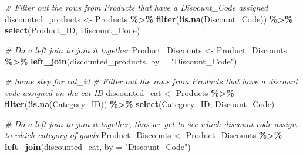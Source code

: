\documentclass[
]{article}
\newenvironment{Shaded}{\begin{snugshade}}{\end{snugshade}}
\newcommand{\AttributeTok}[1]{\textcolor[rgb]{0.13,0.29,0.53}{#1}}
\newcommand{\CommentTok}[1]{\textcolor[rgb]{0.56,0.35,0.01}{\textit{#1}}}
\newcommand{\FunctionTok}[1]{\textcolor[rgb]{0.13,0.29,0.53}{\textbf{#1}}}
\newcommand{\NormalTok}[1]{#1}
\newcommand{\OtherTok}[1]{\textcolor[rgb]{0.56,0.35,0.01}{#1}}
\newcommand{\SpecialCharTok}[1]{\textcolor[rgb]{0.81,0.36,0.00}{\textbf{#1}}}
\newcommand{\StringTok}[1]{\textcolor[rgb]{0.31,0.60,0.02}{#1}}
\begin{document}
\begin{Shaded}
\begin{Highlighting}[]
\CommentTok{\# Filter out the rows from Products that have a Disocunt\_Code assigned }
\NormalTok{discounted\_products }\OtherTok{\textless{}{-}}\NormalTok{ Products }\SpecialCharTok{\%\textgreater{}\%}
  \FunctionTok{filter}\NormalTok{(}\SpecialCharTok{!}\FunctionTok{is.na}\NormalTok{(Discount\_Code)) }\SpecialCharTok{\%\textgreater{}\%}
  \FunctionTok{select}\NormalTok{(Product\_ID, Discount\_Code)}

\CommentTok{\# Do a left join to join it together }
\NormalTok{Product\_Discounts }\OtherTok{\textless{}{-}}\NormalTok{ Product\_Discounts }\SpecialCharTok{\%\textgreater{}\%}
  \FunctionTok{left\_join}\NormalTok{(discounted\_products, }\AttributeTok{by =} \StringTok{"Discount\_Code"}\NormalTok{)}

\CommentTok{\# Same step for cat\_id}
\CommentTok{\# Filter out the rows from Products that have a discount code assigned on the cat ID}
\NormalTok{discounted\_cat }\OtherTok{\textless{}{-}}\NormalTok{ Products }\SpecialCharTok{\%\textgreater{}\%}
  \FunctionTok{filter}\NormalTok{(}\SpecialCharTok{!}\FunctionTok{is.na}\NormalTok{(Category\_ID)) }\SpecialCharTok{\%\textgreater{}\%}
  \FunctionTok{select}\NormalTok{(Category\_ID, Discount\_Code)}

\CommentTok{\# Do a left join to join it together, thus we get to see which discount code assign to which category of goods}
\NormalTok{Product\_Discounts }\OtherTok{\textless{}{-}}\NormalTok{ Product\_Discounts }\SpecialCharTok{\%\textgreater{}\%}
  \FunctionTok{left\_join}\NormalTok{(discounted\_cat, }\AttributeTok{by =} \StringTok{"Discount\_Code"}\NormalTok{)}
\end{Highlighting}
\end{Shaded}
\end{document}
